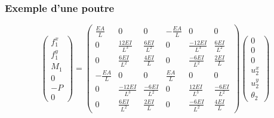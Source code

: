 \documentclass[a4paper]{article}
\newcommand*{\nbFlechesCont}{10}
\newcommand*{\rayonCouple}{0.1}
\newcommand*{\angleCouple}{110}
\newcommand{\chargecont}[4][]{%
	\pgfmathsetmacro{\pas}{#3/\nbFlechesCont}
	\foreach \x in {0,\pas,...,#3}{
		\draw[latex-,#1] ([xshift=\x cm]C) --++(0,0.5);
	}
	\draw[#1]([yshift=0.5 cm]#2)--++(#3,0) node[midway,above]{#4};
}
\newcommand{\couple}[3][]{%
	\draw[->,#1] (#2) +(\angleCouple:\rayonCouple) arc(\angleCouple:-\angleCouple:\rayonCouple) node[anchor=north] {$\mathcal{C}$};
}
\begin{document}
 
 





\subsubsection*{Exemple d'une poutre }
\begin{center}
\end{center}

\[\left(\begin{array}{r} 
f_{1}^x\\f_{1}^y\\M_1\\0\\-P\\0
\end{array}\right)=\left(\begin{array}{rrrrrr} 
\frac{EA}{L}&0&0&-\frac{EA}{L}&0&0\\
0&\frac{12EI}{L^3}&\frac{6EI}{L^2}&0&\frac{-12EI}{L^3}&\frac{6EI}{L^2}\\
0&\frac{6EI}{L^2}&\frac{4EI}{L}&0&\frac{-6EI}{L^2}&\frac{2EI}{L}\\
-\frac{EA}{L}&0&0&\frac{EA}{L}&0&0\\
0&\frac{-12EI}{L^3}&\frac{-6EI}{L^2}&0&\frac{12EI}{L^3}&\frac{-6EI}{L^2}\\
0&\frac{6EI}{L^2}&\frac{2EI}{L}&0&\frac{-6EI}{L^2}&\frac{4EI}{L}
\end{array}\right) \left(\begin{array}{l} 
0\\0\\0\\u_{2}^x\\u_{2}^y\\\theta_2
\end{array}\right)
\]
\end{document}
